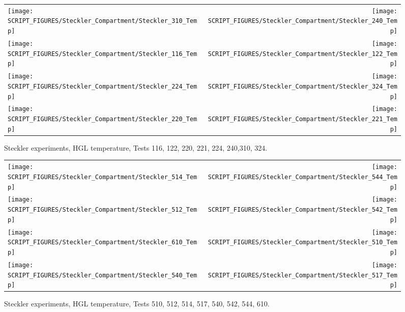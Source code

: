 \begin{figure}[p]
\begin{tabular*}{\textwidth}{l@{\extracolsep{\fill}}r}
\texttt{[image: SCRIPT\_FIGURES/Steckler\_Compartment/Steckler\_310\_Temp]} &
\texttt{[image: SCRIPT\_FIGURES/Steckler\_Compartment/Steckler\_240\_Temp]} \\
\texttt{[image: SCRIPT\_FIGURES/Steckler\_Compartment/Steckler\_116\_Temp]} &
\texttt{[image: SCRIPT\_FIGURES/Steckler\_Compartment/Steckler\_122\_Temp]} \\
\texttt{[image: SCRIPT\_FIGURES/Steckler\_Compartment/Steckler\_224\_Temp]} &
\texttt{[image: SCRIPT\_FIGURES/Steckler\_Compartment/Steckler\_324\_Temp]} \\
\texttt{[image: SCRIPT\_FIGURES/Steckler\_Compartment/Steckler\_220\_Temp]} &
\texttt{[image: SCRIPT\_FIGURES/Steckler\_Compartment/Steckler\_221\_Temp]}
\end{tabular*}
\caption[Steckler experiments, HGL temperature, Tests 116, 122, 220, 221, 224, 240,310, 324]
{Steckler experiments, HGL temperature, Tests 116, 122, 220, 221, 224, 240,310, 324.}
\label{Steckler_Temp_4}
\end{figure}

\begin{figure}[p]
\begin{tabular*}{\textwidth}{l@{\extracolsep{\fill}}r}
\texttt{[image: SCRIPT\_FIGURES/Steckler\_Compartment/Steckler\_514\_Temp]} &
\texttt{[image: SCRIPT\_FIGURES/Steckler\_Compartment/Steckler\_544\_Temp]} \\
\texttt{[image: SCRIPT\_FIGURES/Steckler\_Compartment/Steckler\_512\_Temp]} &
\texttt{[image: SCRIPT\_FIGURES/Steckler\_Compartment/Steckler\_542\_Temp]} \\
\texttt{[image: SCRIPT\_FIGURES/Steckler\_Compartment/Steckler\_610\_Temp]} &
\texttt{[image: SCRIPT\_FIGURES/Steckler\_Compartment/Steckler\_510\_Temp]} \\
\texttt{[image: SCRIPT\_FIGURES/Steckler\_Compartment/Steckler\_540\_Temp]} &
\texttt{[image: SCRIPT\_FIGURES/Steckler\_Compartment/Steckler\_517\_Temp]}
\end{tabular*}
\caption[Steckler experiments, HGL temperature, Tests 510, 512, 514, 517, 540, 542, 544, 610]
{Steckler experiments, HGL temperature, Tests 510, 512, 514, 517, 540, 542, 544, 610.}
\label{Steckler_Temp_5}
\end{figure}

